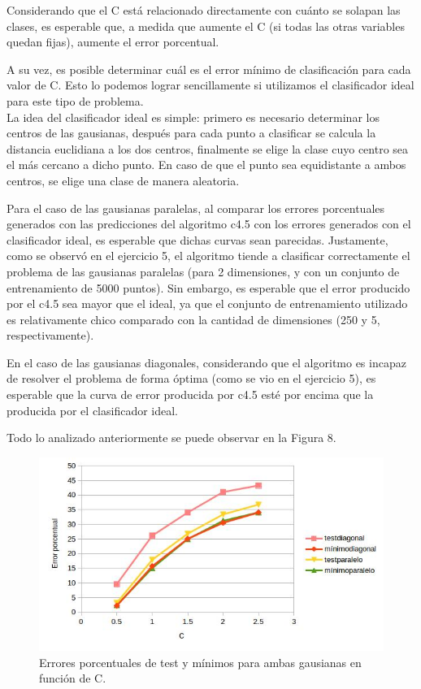 \documentclass[12pt, a4paper]{article}
\begin{document}
\bigskip

Considerando que el C está relacionado directamente con cuánto se solapan las clases, es esperable que, a medida que aumente el C (si todas las otras variables quedan fijas), aumente el error porcentual.

\bigskip

A su vez, es posible determinar cuál es el error mínimo de clasificación para cada valor de C. Esto lo podemos lograr sencillamente si utilizamos el clasificador ideal para este tipo de problema. \\
La idea del clasificador ideal es simple: primero es necesario determinar los centros de las gausianas, después para cada punto a clasificar se calcula la distancia euclidiana a los dos centros, finalmente se elige la clase cuyo centro sea el más cercano a dicho punto. En caso de que el punto sea equidistante a ambos centros, se elige una clase de manera aleatoria.

\bigskip

Para el caso de las gausianas paralelas, al comparar los errores porcentuales generados con las predicciones del algoritmo c4.5 con los errores generados con el clasificador ideal, es esperable que dichas curvas sean parecidas. Justamente, como se observó en el ejercicio 5, el algoritmo tiende a clasificar correctamente el problema de las gausianas paralelas (para 2 dimensiones, y con un conjunto de entrenamiento de 5000 puntos). Sin embargo, es esperable que el error producido por el c4.5 sea mayor que el ideal, ya que el conjunto de entrenamiento utilizado es relativamente chico comparado con la cantidad de dimensiones (250 y 5, respectivamente).

\bigskip

En el caso de las gausianas diagonales, considerando que el algoritmo es incapaz de resolver el problema de forma óptima (como se vio en el ejercicio 5), es esperable que la curva de error producida por c4.5 esté por encima que la producida por el clasificador ideal.

\smallskip

Todo lo analizado anteriormente se puede observar en la Figura 8.


\begin{figure}
    \centering
	\includegraphics[scale=0.70]{ejercicio6}
	\caption{Errores porcentuales de test y mínimos para ambas gausianas en función de C.}
\end{figure}
\end{document}

